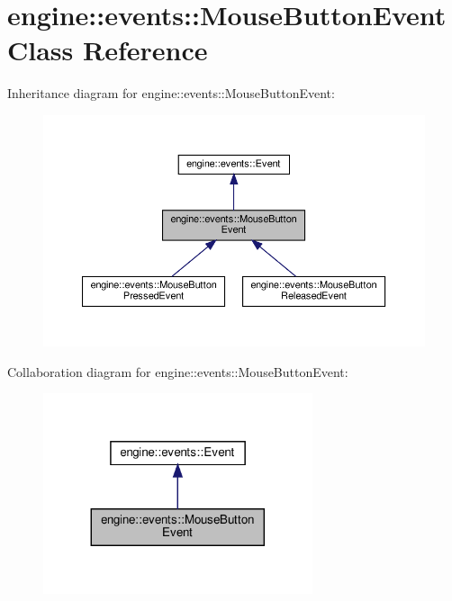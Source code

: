 \hypertarget{classengine_1_1events_1_1MouseButtonEvent}{}\section{engine\+:\+:events\+:\+:Mouse\+Button\+Event Class Reference}
\label{classengine_1_1events_1_1MouseButtonEvent}


Inheritance diagram for engine\+:\+:events\+:\+:Mouse\+Button\+Event\+:\nopagebreak
\begin{figure}[H]
\begin{center}
\leavevmode
\includegraphics[width=350pt]{classengine_1_1events_1_1MouseButtonEvent__inherit__graph}
\end{center}
\end{figure}


Collaboration diagram for engine\+:\+:events\+:\+:Mouse\+Button\+Event\+:\nopagebreak
\begin{figure}[H]
\begin{center}
\leavevmode
\includegraphics[width=224pt]{classengine_1_1events_1_1MouseButtonEvent__coll__graph}
\end{center}
\end{figure}
